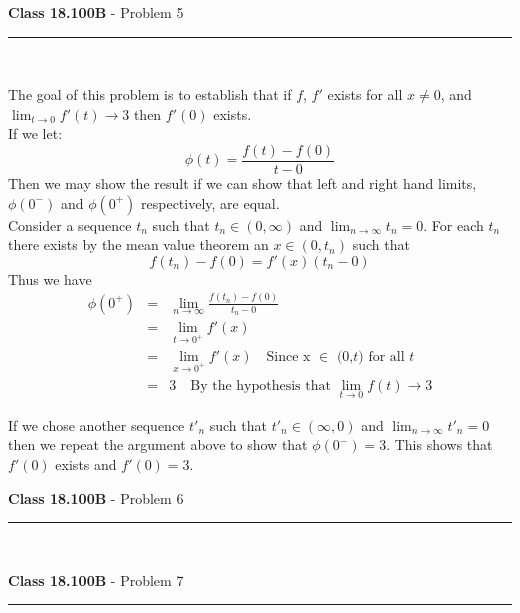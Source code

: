\documentclass[11pt,reqno]{article}
\begin{document}
\newpage

\vspace{15pt}
\begin{flushleft} 
\textbf{Class 18.100B} - Problem 5\\
\rule{500pt}{1pt}\\
\end{flushleft} 

The goal of this problem is to establish that if $f$, $f'$ exists for all $x \neq 0$, and $\lim_{t \to 0}f'(t) \to 3$ then $f'(0)$ exists.\\
\indent If we let:
\[\phi(t) = \frac{f(t) - f(0)}{t - 0}\]
Then we may show the result if we can show that left and right hand limits, $\phi(0^-)$ and $\phi(0^+)$ respectively, are equal.\\
\indent Consider a sequence $t_n$ such that $t_n \in (0,\infty)$ and $\lim_{n \to \infty}t_n = 0$. For each $t_n$ there exists by the mean value theorem an $x \in (0,t_n)$ such that
\[ f(t_n) - f(0) = f'(x)(t_n - 0)\]
Thus we have
\begin{eqnarray*}
\phi(0^+) &=& \lim_{n \to \infty} \frac{f(t_n) - f(0)}{t_n - 0} \\
	       &=& \lim_{t \to 0^+} f'(x) \\
      	       &=& \lim_{x \to 0^+} f'(x) \quad \text{Since x $\in$ (0,$t$) for all $t$}\\
	       &=& 3 \quad \text{By the hypothesis that $\lim_{t \to 0}f(t) \to 3$}
\end{eqnarray*}

If we chose another sequence $t'_n$ such that $t'_n \in (\infty,0)$ and $\lim_{n \to \infty}t'_n = 0$
then we repeat the argument above to show that $\phi(0^-) = 3$. This shows that $f'(0)$ exists and $f'(0) = 3$.

\vspace{15pt}
\begin{flushleft} 
\textbf{Class 18.100B} - Problem 6\\
\rule{500pt}{1pt}\\
\end{flushleft} 


\vspace{15pt}
\begin{flushleft} 
\textbf{Class 18.100B} - Problem 7\\
\rule{500pt}{1pt}\\
\end{flushleft} 


\end{document}
